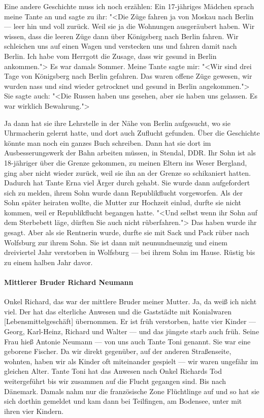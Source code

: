 \documentclass[12pt, twoside]{book}
\begin{document}
Eine andere Geschichte muss ich noch erzählen:
Ein 17-jähriges Mädchen sprach meine Tante an und sagte zu ihr: "<Die Züge fahren ja von Moskau nach Berlin --- leer hin und voll zurück. Weil sie ja die Wohnungen ausgeräubert haben. Wir wissen, dass die leeren Züge dann über Königsberg nach Berlin fahren. Wir schleichen uns auf einen Wagen und verstecken uns und fahren damit nach Berlin. Ich habe vom Herrgott die Zusage, dass wir gesund
in Berlin ankommen."> Es war damals Sommer. Meine Tante sagte mir: "<Wir sind drei Tage von Königsberg nach Berlin gefahren. Das waren offene Züge gewesen, wir wurden nass und sind wieder getrocknet und gesund in 
Berlin angekommen."> Sie sagte auch: "<Die Russen haben uns gesehen, aber sie haben uns gelassen. Es war wirklich Bewahrung.">

Ja dann hat sie ihre Lehrstelle in der Nähe von Berlin aufgesucht, wo sie Uhrmacherin gelernt hatte, und dort auch Zuflucht gefunden.
Über die Geschichte könnte man noch ein ganzes Buch schreiben.
Dann hat sie dort im Ausbesserungswerk der Bahn arbeiten müssen, in Stendal, DDR.
Ihr Sohn ist als 18-jähriger über die Grenze gekommen, zu meinen Eltern ins Weser Bergland, ging aber nicht wieder zurück, weil sie ihn an der Grenze so schikaniert hatten.
Dadurch hat Tante Erna viel Ärger durch gehabt.
Sie wurde dann aufgefordert sich zu melden, ihrem Sohn wurde dann Republikflucht vorgeworfen. Als der Sohn später heiraten wollte, die
Mutter zur Hochzeit einlud, durfte sie nicht kommen, weil er Republikflucht begangen hatte. "<Und selbst wenn ihr Sohn auf dem Sterbebett läge, dürften Sie auch nicht rüberfahren.">
Das haben wurde ihr gesagt.
Aber als sie Rentnerin wurde, durfte sie mit Sack und Pack rüber nach Wolfsburg zur ihrem Sohn.
Sie ist dann mit neunundneunzig und einem dreiviertel Jahr verstorben in Wolfsburg --- bei ihrem Sohn im Hause.
Rüstig bis zu einem halben Jahr davor.

\paragraph{Mittlerer Bruder Richard Neumann} Onkel Richard, das war der mittlere Bruder meiner Mutter. Ja, da weiß ich nicht viel. Der hat das elterliche Anwesen und die Gaststädte mit Konialwaren [Lebensmittelgeschäft] übernommen.
Er ist früh verstorben, hatte vier Kinder --- Georg, Karl-Heinz, Richard und Walter --- und das jüngste starb auch früh. Seine Frau hieß Antonie Neumann --- von uns auch Tante Toni genannt. Sie war eine geborene Fischer.
Da wir direkt gegenüber, auf der anderen Straßenseite, wohnten, haben wir als Kinder oft miteinander gespielt --- wir waren ungefähr im gleichen Alter.
Tante Toni hat das Anwesen nach Onkel Richards Tod weitergeführt bis wir zusammen auf die Flucht gegangen sind. Bis nach Dänemark. Damals nahm nur die französische Zone Flüchtlinge auf und so hat sie sich dorthin gemeldet und kam dann bei Teilfingen, am Bodensee, unter mit ihren vier Kindern.
\end{document}
